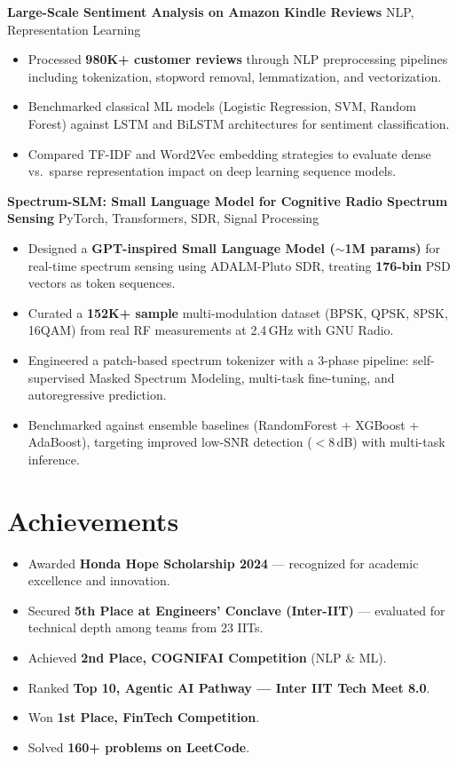 \documentclass[a4paper, 10.5pt]{article}
\newcommand{\entrysingle}[2]{%
  \vspace{4pt}%
  \textbf{#1} \hfill \textcolor{subtext}{\small #2}%
  \vspace{2pt}%
}
\begin{document}
\entrysingle{Large-Scale Sentiment Analysis on Amazon Kindle Reviews}{\normalfont\small\textcolor{subtext}{NLP, Representation Learning}}
\begin{itemize}
  \item Processed \textbf{980K+ customer reviews} through NLP preprocessing pipelines including tokenization, stopword removal, lemmatization, and vectorization.
  \item Benchmarked classical ML models (Logistic Regression, SVM, Random Forest) against LSTM and BiLSTM architectures for sentiment classification.
  \item Compared TF-IDF and Word2Vec embedding strategies to evaluate dense vs.\ sparse representation impact on deep learning sequence models.
\end{itemize}

\entrysingle{Spectrum-SLM: Small Language Model for Cognitive Radio Spectrum Sensing}{\normalfont\small\textcolor{subtext}{PyTorch, Transformers, SDR, Signal Processing}}
\begin{itemize}
  \item Designed a \textbf{GPT-inspired Small Language Model ($\sim$1M params)} for real-time spectrum sensing using ADALM-Pluto SDR, treating \textbf{176-bin} PSD vectors as token sequences.
  \item Curated a \textbf{152K+ sample} multi-modulation dataset (BPSK, QPSK, 8PSK, 16QAM) from real RF measurements at 2.4\,GHz with GNU Radio.
  \item Engineered a patch-based spectrum tokenizer with a 3-phase pipeline: self-supervised Masked Spectrum Modeling, multi-task fine-tuning, and autoregressive prediction.
  \item Benchmarked against ensemble baselines (RandomForest + XGBoost + AdaBoost), targeting improved low-SNR detection ($<$8\,dB) with multi-task inference.
\end{itemize}

\section{Achievements}

\begin{itemize}
  \item Awarded \textbf{Honda Hope Scholarship 2024} --- recognized for academic excellence and innovation.
  \item Secured \textbf{5th Place at Engineers' Conclave (Inter-IIT)} --- evaluated for technical depth among teams from 23 IITs.
  \item Achieved \textbf{2nd Place, COGNIFAI Competition} (NLP \& ML).
  \item Ranked \textbf{Top 10, Agentic AI Pathway --- Inter IIT Tech Meet 8.0}.
  \item Won \textbf{1st Place, FinTech Competition}.
  \item Solved \textbf{160+ problems on LeetCode}.
\end{itemize}
\end{document}
